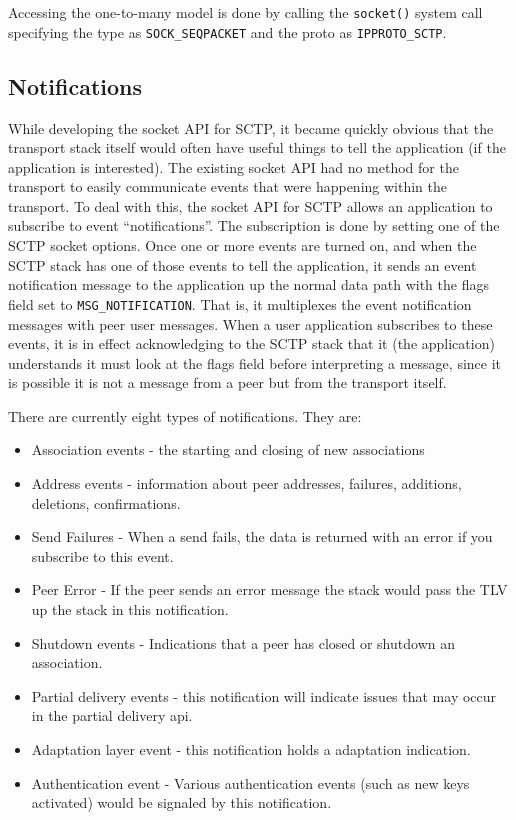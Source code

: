 \documentclass[conference]{IEEEtran}
\begin{document}
Accessing the one-to-many model is done by calling the \texttt{socket()} system call specifying the type as
\texttt{SOCK\_SEQPACKET} and the proto as \texttt{IPPROTO\_SCTP}.

\subsection{Notifications}

While developing the socket API for SCTP, it became quickly obvious
that the transport stack itself would often have useful things to tell the application 
(if the application is interested). The existing socket API had no method
for the transport to easily communicate events that were happening
within the transport. To deal with this, the socket API for SCTP allows an
application to subscribe to event ``notifications''. The subscription is
done by setting one of the SCTP socket options. Once one or more events are
turned on, and when the SCTP stack has one of those events to tell the application,
it sends an event notification message to the application up the normal data 
path with the flags field set to \texttt{MSG\_NOTIFICATION}. That is, it multiplexes 
the event notification messages with peer user messages.  When a user application
subscribes to these events, it is in effect acknowledging to the SCTP stack that it
(the application) understands it must look at the flags field before interpreting
a message, since it is possible it is not a message from a peer but from the transport
itself.

There are currently eight types of notifications. They are:
\begin{itemize}
 \item  Association events - the starting and closing of new associations
 \item  Address events - information about peer addresses, failures, additions, deletions, confirmations.
 \item  Send Failures - When a send fails, the data is returned with an error if you subscribe to this event.
 \item  Peer Error - If the peer sends an error message the stack would pass the TLV up the stack in this notification.
 \item  Shutdown events - Indications that a peer has closed or shutdown an association.
 \item  Partial delivery events - this notification will indicate issues that may occur in the partial delivery api.
 \item  Adaptation layer event - this notification holds a adaptation indication.
 \item  Authentication event - Various authentication events (such as new keys activated) would be signaled by this notification.
 \end{itemize}
\end{document}
